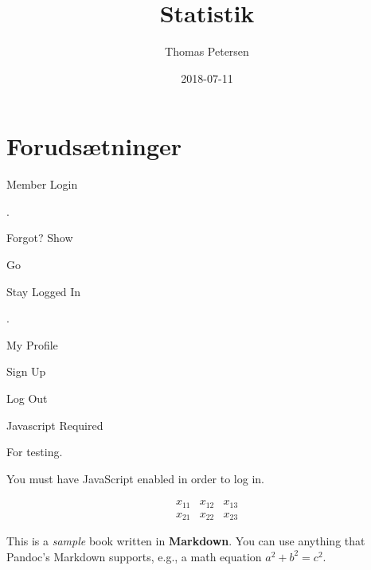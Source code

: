 \documentclass[]{book}
\title{Statistik}
\author{Thomas Petersen}
\date{2018-07-11}
\theoremstyle{definition}
\theoremstyle{definition}
\theoremstyle{definition}
\theoremstyle{remark}
\begin{document}
\maketitle

{
\setcounter{tocdepth}{1}
\tableofcontents
}
\hypertarget{forudstninger}{%
\chapter{Forudsætninger}\label{forudstninger}}

\hypertarget{Settings}{}

\hypertarget{TopBar}{}
\hypertarget{Sentry_label}{}
\protect\hypertarget{Sentry_label_span}{}{Member
Login}\protect\hypertarget{downArrow}{}{}

\hypertarget{magicGroup}{}
\hypertarget{messages}{}
.

\hypertarget{Sentry_emailDiv}{}
{ }

\hypertarget{Sentry_passwordDiv}{}
{ }

\hypertarget{Sentry_HIDpasswordDiv}{}
{ }

\hypertarget{unHideDiv}{}
\protect\hypertarget{forgotSpan}{}{Forgot?}
\protect\hypertarget{unHideSpan}{}{Show}

\hypertarget{buttonDiv}{}
Go

\hypertarget{psistDiv}{}
 \protect\hypertarget{psistSpan}{}{Stay Logged In}

\hypertarget{goInside}{}
\protect\hypertarget{goInsideSpan}{}{.}

\hypertarget{myProfile}{}
My Profile

\hypertarget{signUp}{}
Sign Up

\hypertarget{logOut}{}
{Log Out}

\hypertarget{xbox}{}

\hypertarget{Sentry_noJSLogin}{}
{Javascript Required}

\hypertarget{Sentry_loggingIn}{}

\hypertarget{Sentry_In}{}
For testing.

You must have JavaScript enabled in order to log in.

\[\begin{array}{ccc}
x_{11} & x_{12} & x_{13}\\
x_{21} & x_{22} & x_{23}
\end{array}\]

This is a \emph{sample} book written in \textbf{Markdown}. You can use
anything that Pandoc's Markdown supports, e.g., a math equation
\(a^2 + b^2 = c^2\).
\end{document}

